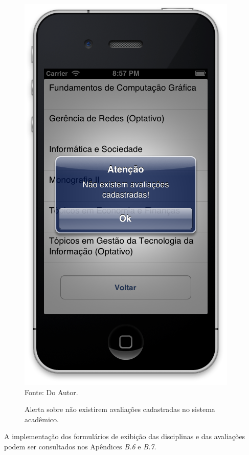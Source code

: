 \begin{figure}[!htb]
     \centering
     \caption[Formulário Notas da Graduação - Inexistência de Avaliações]{Alerta sobre não existirem avaliações cadastradas no sistema acadêmico.}
     \includegraphics[scale=0.34]{imagens/alertanaoexistemavaliacoes.png}
     \\  Fonte: Do Autor.
\end{figure}

A implementação dos formulários de exibição das disciplinas e das avaliações podem ser consultados nos Apêndices \emph{B.6} e \emph{B.7}.

